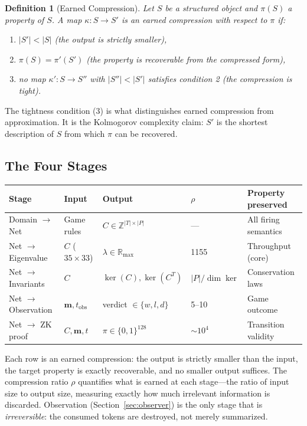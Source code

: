 \documentclass[11pt,a4paper]{article}
\newtheorem{definition}[theorem]{Definition}
\newcommand{\R}{\mathbb{R}}
\newcommand{\Z}{\mathbb{Z}}
\newcommand{\Rmax}{\R_{\max}}
\begin{document}
\begin{definition}[Earned Compression]
\label{def:compression}
Let $S$ be a structured object and $\pi(S)$ a property of $S$.
A map $\kappa : S \to S'$ is an \emph{earned compression} with respect to $\pi$ if:
\begin{enumerate}
  \item $|S'| < |S|$ (the output is strictly smaller),
  \item $\pi(S) = \pi'(S')$ (the property is recoverable from the compressed form),
  \item no map $\kappa' : S \to S''$ with $|S''| < |S'|$ satisfies condition 2 (the compression is tight).
\end{enumerate}
\end{definition}

The tightness condition (3) is what distinguishes earned compression from approximation.
It is the Kolmogorov complexity claim: $S'$ is the shortest description of $S$ from which $\pi$ can be recovered.

\subsection{The Four Stages}

\begin{center}
\begin{tabular}{@{}lllll@{}}
\toprule
\textbf{Stage} & \textbf{Input} & \textbf{Output} & \textbf{$\rho$} & \textbf{Property preserved} \\
\midrule
Domain $\to$ Net & Game rules & $C \in \Z^{|T| \times |P|}$ & --- & All firing semantics \\
Net $\to$ Eigenvalue & $C$ ($35 \times 33$) & $\lambda \in \Rmax$ & 1155 & Throughput (core) \\
Net $\to$ Invariants & $C$ & $\ker(C), \ker(C^T)$ & $|P|/\dim\ker$ & Conservation laws \\
Net $\to$ Observation & $\mathbf{m}, t_{\mathrm{obs}}$ & verdict $\in \{w, l, d\}$ & 5--10 & Game outcome \\
Net $\to$ ZK proof & $C, \mathbf{m}, t$ & $\pi \in \{0,1\}^{128}$ & $\sim 10^4$ & Transition validity \\
\bottomrule
\end{tabular}
\end{center}

Each row is an earned compression: the output is strictly smaller than the input, the target property is exactly recoverable, and no smaller output suffices.
The compression ratio $\rho$ quantifies what is earned at each stage---the ratio of input size to output size, measuring exactly how much irrelevant information is discarded.
Observation (Section~\ref{sec:observer}) is the only stage that is \emph{irreversible}: the consumed tokens are destroyed, not merely summarized.
\end{document}
